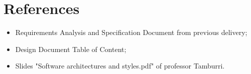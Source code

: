 \documentclass[12pt,a4paper]{article}
\begin{document}
	
	\tableofcontents
	\newpage
	
	
	
	
	
	\newpage
	\section{References}
	\begin{itemize}
		\item Requirements Analysis and Specification Document from previous delivery;
		\item Design Document Table of Content;
		\item Slides "Software architectures and styles.pdf" of professor Tamburri.
	\end{itemize}
	
	
\end{document}

